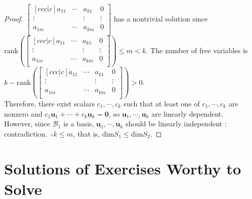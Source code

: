 \begin{proof}
	$\begin{bmatrix}[ccc|c]
	a_{11} & \cdots & a_{k1} & 0 \\
	\vdots & & \vdots & \vdots \\
	a_{1m} & \cdots & a_{km} & 0 \\
	\end{bmatrix}$ has a nontrivial solution since 
	$ \text{rank}\left(\begin{bmatrix}[ccc|c]
	a_{11} & \cdots & a_{k1} & 0 \\
	\vdots & & \vdots & \vdots \\
	a_{1m} & \cdots & a_{km} & 0 \\
	\end{bmatrix}\right) \leq m < k$. 
	The number of free variables is $ k-\text{rank}\left(\begin{bmatrix}[ccc|c]
	a_{11} & \cdots & a_{k1} & 0 \\
	\vdots & & \vdots & \vdots \\
	a_{1m} & \cdots & a_{km} & 0 \\
	\end{bmatrix}\right) > 0 $. \\
	Therefore, there exist scalars $ c_{1}, \cdots, c_{k} $ such that at least one of $ c_{1}, \cdots, c_{k} $ are nonzero and $ c_{1}\textbf{u}_{1} + \cdots + c_{k}\textbf{u}_{k} = \textbf{0}$, so $ \textbf{u}_{1}, \cdots , \textbf{u}_{k} $ are linearly dependent. \\
	However, since $ \mathcal{B}_{1} $ is a basis, $ \textbf{u}_{1}, \cdots , \textbf{u}_{k} $ should be linearly independent : contradiction.
	$ \therefore k\leq m $, that is, $ \text{dim} S_{1} \leq \text{dim} S_{2} $.
\end{proof}

\section{Solutions of Exercises Worthy to Solve}



